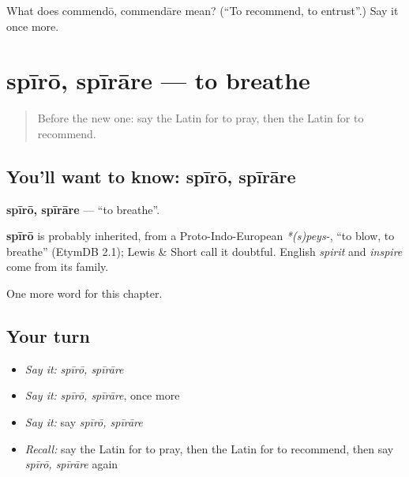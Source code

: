 \begin{tcolorbox}[breakable,colback=teal!4,colframe=teal!35!black,title={Before you move on}]
What does commendō, commendāre mean? (\textquotedblleft{}To recommend, to entrust\textquotedblright{}.) Say it once more.
\end{tcolorbox}
\section[spīrō, spīrāre]{spīrō, spīrāre — to breathe}

\label{lesson:LA-C259-spiro}



\begin{quote}
Before the new one: say the Latin for to pray, then the Latin for to recommend.
\end{quote}

\subsection*{You'll want to know: spīrō, spīrāre}
\textbf{spīrō, spīrāre} — \textquotedblleft{}to breathe\textquotedblright{}.

\begin{cousinweb}
\textbf{spīrō} is probably inherited, from a Proto-Indo-European \emph{*(s)peys-}, \textquotedblleft{}to blow, to breathe\textquotedblright{} (EtymDB 2.1); Lewis \& Short call it doubtful. English \emph{spirit} and \emph{inspire} come from its family.
\end{cousinweb}

\begin{grammarlens}[title={What you've built}]
One more word for this chapter.
\end{grammarlens}

\subsection*{Your turn}
\begin{itemize}
\raggedright
  \item \emph{Say it:} \emph{spīrō, spīrāre}
  \item \emph{Say it:} \emph{spīrō, spīrāre}, once more
  \item \emph{Say it:} say \emph{spīrō, spīrāre}
  \item \emph{Recall:} say the Latin for to pray, then the Latin for to recommend, then say \emph{spīrō, spīrāre} again
\end{itemize}

